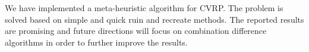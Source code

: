 \documentclass[../main.tex]{}
\begin{document}
We have implemented a meta-heuristic algorithm for CVRP. The problem is solved based on simple and quick ruin and recreate methods. The reported results are promising and future directions will focus on combination difference algorithms in order to further improve the results.
\end{document}
